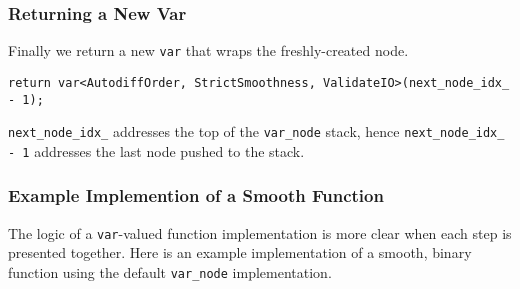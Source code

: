 \subsubsection{Returning a New Var}

Finally we return a new \verb|var| that wraps the freshly-created node.
%
\begin{verbatim}
return var<AutodiffOrder, StrictSmoothness, ValidateIO>(next_node_idx_ - 1);
\end{verbatim}
%
\verb|next_node_idx_| addresses the top of the \verb|var_node| stack, hence
\verb|next_node_idx_ - 1| addresses the last node pushed to the stack.

\subsubsection{Example Implemention of a Smooth Function}

The logic of a \verb|var|-valued function implementation is more clear
when each step is presented together.  Here is an example implementation
of a smooth, binary function using the default \verb|var_node| implementation.

